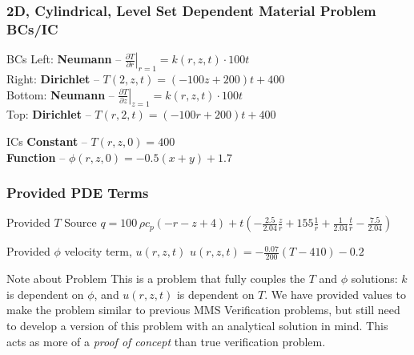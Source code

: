 \documentclass[]{beamer}
\begin{document}
\begin{frame}[t]\frametitle{2D, Cylindrical, Level Set Dependent Material Problem BCs/IC}
  \begin{block}{BCs}
    Left: \textbf{Neumann} -- $\left. \frac{\partial T}{\partial r}\right|_{r=1} = k(r,z,t)\cdot 100t$ \\
    Right: \textbf{Dirichlet} -- $T(2,z,t) = (-100z + 200)t +400$ \\
    Bottom: \textbf{Neumann} -- $\left. \frac{\partial T}{\partial z}\right|_{z=1} = k(r,z,t)\cdot 100t$ \\
    Top: \textbf{Dirichlet} -- $T(r,2,t) = (-100r + 200)t + 400$
  \end{block}
  
  \begin{block}{ICs}
    \textbf{Constant} -- $T(r,z,0) = 400$ \\
    \textbf{Function} -- $\phi(r,z,0) = -0.5(x+y) + 1.7$
  \end{block}
\end{frame}

\begin{frame}[t]\frametitle{Provided PDE Terms}
  
  \begin{block}{Provided $T$ Source}
  $q = 100\,\rho c_p \left(-r-z+4\right)+ t\left(-\frac{2.5}{2.04}\frac{z}{r} + 155\frac{1}{r}
  +\frac{1}{2.04}\frac{t}{r} - \frac{7.5}{2.04}\right)$
  \end{block}
  
  
  \begin{block}{Provided $\phi$ velocity term, $u(r,z,t)$}
    $u(r,z,t) = -\frac{0.07}{200} \left( T-410\right)-0.2$
  \end{block}
  
  \begin{block}{Note about Problem}
    This is a problem that fully couples the $T$ and $\phi$ solutions: $k$ is dependent on 
    $\phi$, and $u(r,z,t)$ is dependent on $T$. We have provided values to make the problem
    similar to previous MMS Verification problems, but still need to develop a version of
    this problem with an analytical solution in mind. This acts as more of a \textit{proof of 
    concept} than true verification problem.
  \end{block}
\end{frame}
\end{document}
